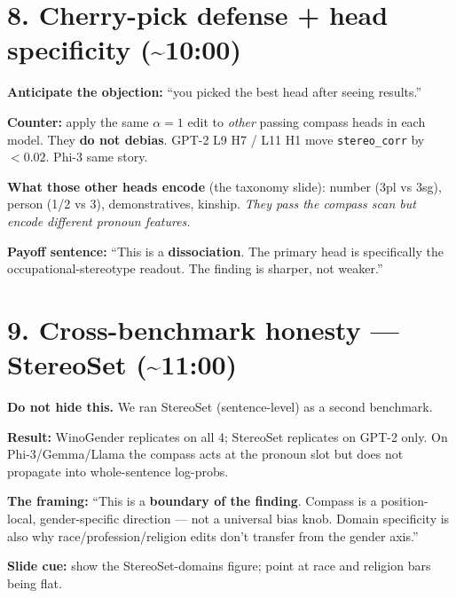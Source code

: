 \documentclass[11pt]{article}
\begin{document}
\section*{8. Cherry-pick defense + head specificity (\textasciitilde 10:00)}
\begin{tcolorbox}[beat]
\textbf{Anticipate the objection:} ``you picked the best head after seeing
results.''

\textbf{Counter:} apply the same $\alpha{=}1$ edit to \emph{other} passing
compass heads in each model. They \textbf{do not debias}. GPT-2 L9 H7 / L11
H1 move \texttt{stereo\_corr} by $<0.02$. Phi-3 same story.

\textbf{What those other heads encode} (the taxonomy slide):
number (3pl vs 3sg), person (1/2 vs 3), demonstratives, kinship.
\emph{They pass the compass scan but encode different pronoun features.}

\textbf{Payoff sentence:} ``This is a \textbf{dissociation}. The primary head
is specifically the occupational-stereotype readout. The finding is sharper,
not weaker.''
\end{tcolorbox}

\section*{9. Cross-benchmark honesty --- StereoSet (\textasciitilde 11:00)}
\begin{tcolorbox}[beat]
\textbf{Do not hide this.} We ran StereoSet (sentence-level) as a second
benchmark.

\textbf{Result:} WinoGender replicates on all 4; StereoSet replicates on
GPT-2 only. On Phi-3/Gemma/Llama the compass acts at the pronoun slot but
does not propagate into whole-sentence log-probs.

\textbf{The framing:} ``This is a \textbf{boundary of the finding}. Compass
is a position-local, gender-specific direction --- not a universal bias
knob. Domain specificity is also why race/profession/religion edits don't
transfer from the gender axis.''

\textbf{Slide cue:} show the StereoSet-domains figure; point at race and
religion bars being flat.
\end{tcolorbox}

\end{document}
